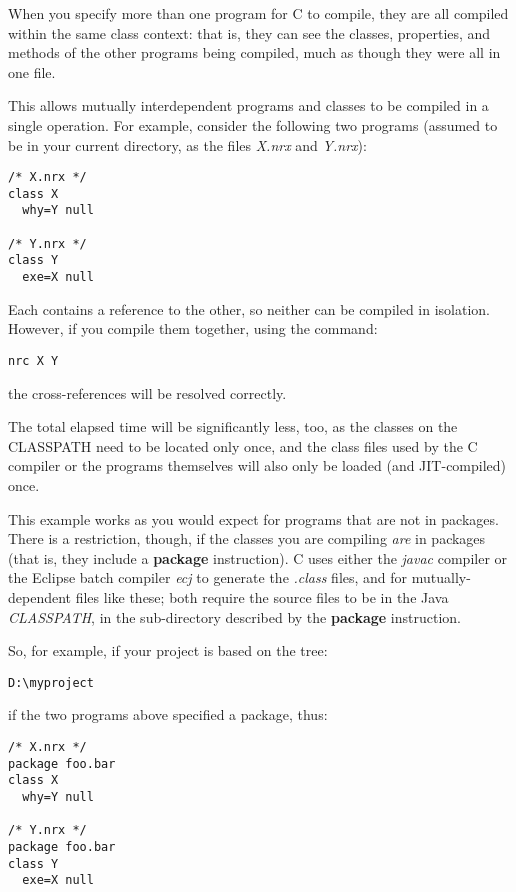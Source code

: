 When you specify more than one program for \nr{}C to compile, they are
all compiled within the same class context: that is, they can see
the classes, properties, and methods of the other programs being
compiled, much as though they were all in one file.

This allows mutually interdependent programs and classes to be compiled
in a single operation.  For example, consider the following two programs
(assumed to be in your current directory, as the files \emph{X.nrx}
and \emph{Y.nrx}):
\begin{lstlisting}[label=dependencies,caption=Dependencies]
/* X.nrx */
class X
  why=Y null

/* Y.nrx */
class Y
  exe=X null
\end{lstlisting}
Each contains a reference to the other, so neither can be compiled in
isolation.  However, if you compile them together, using the command:
\begin{verbatim}
nrc X Y
\end{verbatim}
 the cross-references will be resolved correctly.

The total elapsed time will be significantly less, too, as the classes
on the CLASSPATH need to be located only once, and the class files used
by the \nr{}C compiler or the programs themselves will also only be
loaded (and JIT-compiled) once.

This example works as you would expect for programs that are not in
packages.  There is a restriction, though, if the classes you are
compiling \emph{are} in packages (that is, they include a
\textbf{package} instruction).  \nr{}C uses either the \emph{javac}
compiler or the Eclipse batch compiler \emph{ecj} to generate the \emph{.class} files, and for mutually-dependent
files like these; both require the source files to be in the
Java \emph{CLASSPATH}, in the sub-directory described by the \textbf{package}
instruction.


So, for example, if your project is based on the tree:

\texttt{D:\textbackslash myproject}

 if the two programs above specified a package, thus:
\begin{lstlisting}[label=packagedep,caption=Package Dependencies]
/* X.nrx */
package foo.bar
class X
  why=Y null

/* Y.nrx */
package foo.bar
class Y
  exe=X null
\end{lstlisting}


